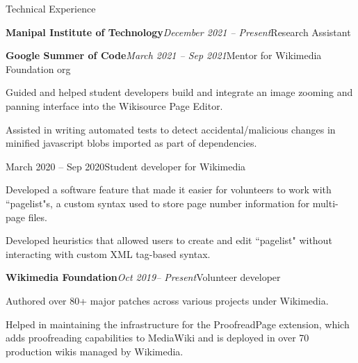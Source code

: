 \documentclass{resume} %
\begin{document}
\begin{rSection}{Technical Experience}
\begin{rSubsection}{\bf Manipal Institute of Technology}{\em December 2021 -- Present}{Research Assistant}{}
\end{rSubsection}
\begin{rSubsection}{\bf Google Summer of Code}{\em March 2021 -- Sep 2021}{Mentor for Wikimedia Foundation org}{}
\item Guided and helped student developers build and integrate an image zooming and panning interface into the Wikisource Page Editor.
\item Assisted in writing automated tests to detect accidental/malicious changes in minified javascript blobs imported as part of dependencies.
\end{rSubsection}
\begin{rSubsectionContd}{March 2020 -- Sep 2020}{Student developer for Wikimedia}
\item Developed a software feature that made it easier for volunteers to work with ``pagelist"s, a custom syntax used to store page number information for multi-page files.
\item Developed heuristics that allowed users to create and edit ``pagelist" without interacting with custom XML tag-based syntax. 
\end{rSubsectionContd}
\begin{rSubsection}{\bf Wikimedia Foundation}{\em Oct 2019-- Present}{Volunteer developer}{}
\item Authored over 80+ major patches across various projects under Wikimedia.
\item Helped in maintaining the infrastructure for the ProofreadPage extension, which adds proofreading capabilities to MediaWiki and is deployed in over 70 production wikis managed by Wikimedia.
\end{rSubsection}
\end{rSection}
\end{document}
